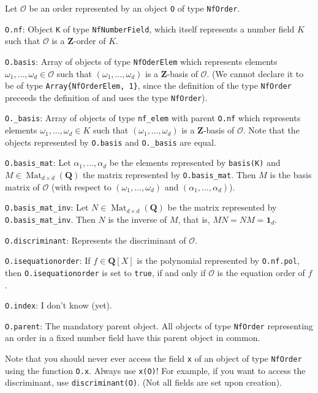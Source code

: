 \documentclass[a4paper,10pt]{article}
\newcommand{\Z}{\mathbf{Z}}
\newcommand{\Q}{\mathbf{Q}}
\newcommand{\code}{\lstinline}
\newcommand{\Mat}{\operatorname{Mat}}
\newcommand*{\descitem}{%
\everyhbox{\everyhbox{}\aftergroup\finishdescitem}%
\setbox\itembox\hbox
}
\newcommand*{\finishdescitem}{%
\everyhbox{}%
\item[\box\itembox]%
}
\begin{document}
Let $\mathcal O$ be an order represented by an object \code{O} of type \code{NfOrder}. 

\begin{description}
\descitem{\code{O.nf}:} Object \code{K} of type \code{NfNumberField}, which itself represents a number field $K$ such that $\mathcal O$ is a $\Z$-order of $K$.

\descitem{\code{O.basis}:} Array of objects of type \code{NfOderElem} which represents elements $\omega_1,\dotsc,\omega_d \in \mathcal O$ such that $(\omega_1,\dotsc,\omega_d)$ is a $\Z$-basis of $\mathcal O$.
(We cannot declare it to be of type \lstinline!Array{NfOrderElem, 1}!, since the definition of the type \code{NfOrder} preceeds the definition of and uses the type \code{NfOrder}).

\descitem{\code{O._basis}:} Array of objects of type \code{nf_elem} with parent \code{O.nf} which represents elements $\omega_1,\dotsc,\omega_d \in K$ such that $(\omega_1,\dotsc,\omega_d)$ is a $\Z$-basis of $\mathcal O$. Note that the objects represented by \code{O.basis} and \code{O._basis} are equal.

\descitem{\code{O.basis_mat}:} Let $\alpha_1,\dotsc,\alpha_d$ be the elements represented by \code{basis(K)} and $M \in \Mat_{d\times d}(\Q)$ the matrix represented by \code{O.basis_mat}. Then $M$ is the basis matrix of $\mathcal O$ (with respect to $(\omega_1,\dotsc,\omega_d)$ and $(\alpha_1,\dotsc,\alpha_d)$).

\descitem{\code{O.basis_mat_inv}:} Let $N \in \Mat_{d \times d}(\Q)$ be the matrix represented by \code{O.basis_mat_inv}. Then $N$ is the inverse of $M$, that is, $M N = N M = \mathbf{1}_d$.

\descitem{\code{O.discriminant}:} Represents the discriminant of $\mathcal O$.

\descitem{\code{O.isequationorder}:} If $f \in \Q[X]$ is the polynomial represented by \code{O.nf.pol}, then \code{O.isequationorder} is set to \code{true}, if and only if $\mathcal O$ is the equation order of $f$.

\descitem{\code{O.index}:} I don't know (yet).

\descitem{\code{O.parent}:} The mandatory parent object. All objects of type \code{NfOrder} representing an order in a fixed number field have this parent object in common.
\end{description}

Note that you should never ever access the field \code{x} of an object of type \code{NfOrder} using the function \code{O.x}. Always use \code{x(O)}!
For example, if you want to access the discriminant, use \code{discriminant(O)}.
(Not all fields are set upon creation).
\end{document}
